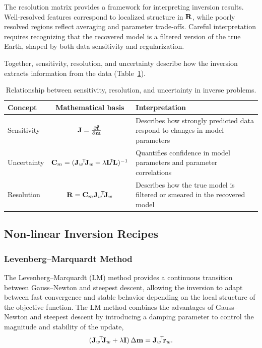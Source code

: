 The resolution matrix provides a framework for interpreting inversion results. Well-resolved features correspond to localized structure in $\vb{R}$, while poorly resolved regions reflect averaging and parameter trade-offs. Careful interpretation requires recognizing that the recovered model is a filtered version of the true Earth, shaped by both data sensitivity and regularization.

Together, sensitivity, resolution, and uncertainty describe how the inversion extracts information from the data (Table~\ref{tab:resolve}).
\begin{table}[hbt]
    \centering
    \caption{Relationship between sensitivity, resolution, and uncertainty in inverse problems.}
    \label{tab:resolve}
    \begin{tabularx}{\textwidth}{@{}lcX@{}}
        \toprule
        Concept & Mathematical basis & Interpretation \\
        \midrule
        Sensitivity 
        & $\vb{J} = \pdv{\tilde{\vb{f}}}{\vb{m}}$ 
        & Describes how strongly predicted data respond to changes in model parameters \\

        Uncertainty 
        & $\vb{C}_m = (\vb{J}_w\!^\mathsf{T}\! \vb{J}_w + \lambda \vb{L}\!^\mathsf{T}\! \vb{L})^{-1}$ 
        & Quantifies confidence in model parameters and parameter correlations \\

        Resolution 
        & $\vb{R} = \vb{C}_m \vb{J}_w\!^\mathsf{T}\! \vb{J}_w$ 
        & Describes how the true model is filtered or smeared in the recovered model \\
        \bottomrule
    \end{tabularx}
\end{table}

\subsection{Non-linear Inversion Recipes}

\subsubsection{Levenberg--Marquardt Method}

The Levenberg--Marquardt (LM) method provides a continuous transition between Gauss--Newton and steepest descent, allowing the inversion to adapt between fast convergence and stable behavior depending on the local structure of the objective function. The LM method combines the advantages of Gauss--Newton and steepest descent by introducing a damping parameter to control the magnitude and stability of the update,
\[
    (\vb{J}_w\!^\mathsf{T}\! \vb{J}_w + \lambda \vb{I}) \, \Delta \vb{m}
    = \vb{J}_w\!^\mathsf{T}\! \vb{r}_w.
\]

